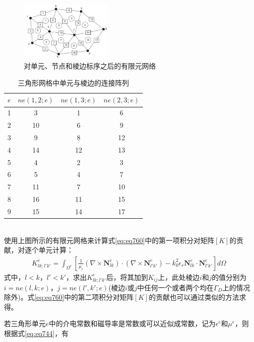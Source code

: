 \documentclass{article}
\numberwithin{equation}{section}
\begin{document}
\begin{figure}[ht]
    \centering
    \includegraphics[width=0.4\textwidth]{对单元_节点和棱边标序之后的有限元网络.PNG}
    \caption{对单元、节点和棱边标序之后的有限元网络}
    \label{fig:fig62}
\end{figure}
\begin{table}[!ht]
    \centering
    \caption{三角形网格中单元与棱边的连接阵列}
    \label{tab:tab4}
    \begin{tabular}{cccc}
        \toprule
        $e$ & $ne(1,2;e)$ & $ne(1,3;e)$ & $ne(2,3;e)$ \\
        \midrule
        1 & 3  & 1  & 6 \\
        2 & 10 & 6  & 9 \\
        3 & 9  & 8  & 12 \\
        4 & 14 & 12 & 13 \\
        5 & 4  & 2  & 3 \\
        6 & 5  & 4  & 7 \\
        7 & 11 & 7  & 10 \\
        8 & 16 & 11 & 15 \\
        9 & 15 & 14 & 17 \\
        \bottomrule
     \end{tabular}
\end{table}
\\
使用上图所示的有限元网格来计算式\ref{eq:eq760}中的第一项积分对矩阵$[K]$的贡献，对逐个单元计算：
\begin{align}
    \label{eq:eq764}
    K_{lk;l'k'}^e=\int_{\Omega^e}\left[\frac{1}{\mu_r}\left(\nabla\times\mathbf{N}_{lk}^e\right)\cdot\left(\nabla\times\mathbf{N}_{l'k'}^e\right)-k_0^2\epsilon_r\mathbf{N}_{lk}^e\cdot\mathbf{N}_{l'k'}^e\right]d\Omega
\end{align}
式中，$l<k$，$l'<k'$，求出$K_{lk;l'k'}^e$后，将其加到$K_{ij}$上，此处棱边$i$和$j$的值分别为$i=ne(l,k;e)$，$j=ne(l',k';e)$(棱边$i$或$j$中任何一个或者两个均在$\Gamma_D$上的情况除外)。式\ref{eq:eq760}中的第二项积分对矩阵$[K]$的贡献也可以通过类似的方法求得。\par
若三角形单元$e$中的介电常数和磁导率是常数或可以近似成常数，记为$\epsilon^e$和$\mu^e$，则根据式\ref{eq:eq744}，有
\end{document}
